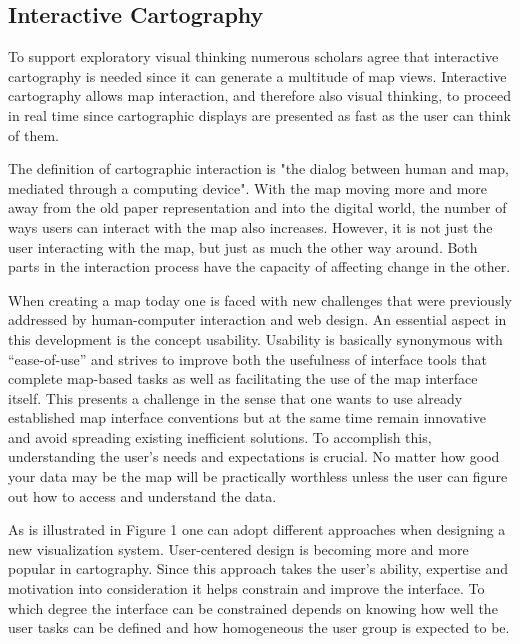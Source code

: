 \documentclass[a4paper,12pt,titlepage]{article}
\begin{document}
\subsection{Interactive Cartography}

To support exploratory visual thinking numerous scholars agree that interactive cartography is needed since it can generate a multitude of map views. \citep{roth2013interactive} Interactive cartography allows map interaction, and therefore also visual thinking, to proceed in real time since cartographic displays are presented as fast as the user can think of them. 

The definition of cartographic interaction is "the dialog between human and map, mediated through a computing device". \citep{roth2013interactive} With the map moving more and more away from the old paper representation and into the digital world, the number of ways users can interact with the map also increases. However, it is not just the user interacting with the map, but just as much the other way around. Both parts in the interaction process have the capacity of affecting change in the other. \citep[pp. 377-379]{rothFramework} %

When creating a map today one is faced with new challenges that were previously addressed by human-computer interaction and web design. An essential aspect in this development is the concept usability. Usability is basically synonymous with “ease-of-use” and strives to improve both the usefulness of interface tools that complete map-based tasks as well as facilitating the use of the map interface itself. This presents a challenge in the sense that one wants to use already established map interface conventions but at the same time remain innovative and avoid spreading existing inefficient solutions. To accomplish this, understanding the user’s needs and expectations is crucial. No matter how good your data may be the map will be practically worthless unless the user can figure out how to access and understand the data.
\citep {mapInterface}

As is illustrated in Figure 1 one can adopt different approaches when designing a new visualization system. User-centered design is becoming more and more popular in cartography. Since this approach takes the user’s ability, expertise and motivation into consideration it helps constrain and improve the interface. To which degree the interface can be constrained depends on knowing how well the user tasks can be defined and how homogeneous the user group is expected to be. \citep{roth2013interactive} 
\end{document}
